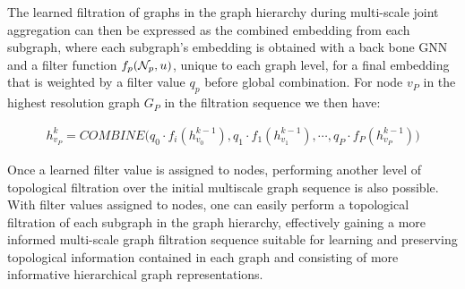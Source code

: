 The learned filtration of graphs in the graph hierarchy during multi-scale joint aggregation can then be expressed as the combined embedding from each subgraph, where each subgraph's embedding is obtained with a back bone GNN and a filter function $f_p(\mathcal{N}_p,u)$, unique to each graph level, for a final embedding that is weighted by a filter value $q_p$ before global combination. For node $v_P$ in the highest resolution graph $G_P$ in the filtration sequence we then have:

\begin{align*}
h_{v_P}^{k} = COMBINE\big( q_0\cdot f_i(h_{v_0}^{k-1}), q_1 \cdot f_1(h_{v_1}^{k-1}),\cdots,q_{P} \cdot f_P(h_{v_P}^{k-1})\big)
\end{align*}
 
Once a learned filter value is assigned to nodes, performing another level of topological filtration over the initial multiscale graph sequence is also possible. With filter values assigned to nodes, one can easily perform a topological filtration of each subgraph in the graph hierarchy, effectively gaining a more informed multi-scale graph filtration sequence suitable for learning and preserving topological information contained in each graph and consisting of more informative hierarchical graph representations. 